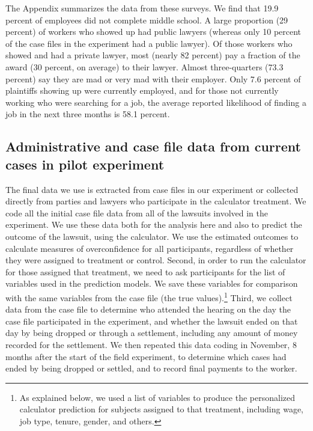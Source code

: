 \documentclass[11pt]{article}
\begin{document}
The Appendix summarizes the data from these surveys. We find that 19.9 percent of employees did not complete middle school. A large proportion (29 percent) of workers who showed up had public lawyers (whereas only 10 percent of the case files in the experiment had a public lawyer). Of those workers who showed and had a private lawyer, most (nearly 82 percent) pay a fraction of the award (30 percent, on average) to their lawyer. Almost three-quarters (73.3 percent) say they are mad or very mad with their employer. Only 7.6 percent of plaintiffs showing up were currently employed, and for those not currently working who were searching for a job, the average reported likelihood of finding a job in the next three months is 58.1 percent.

\subsection{Administrative and case file data from current cases in pilot experiment}


The final data we use is extracted from case files in our experiment or collected directly from
parties and lawyers who participate in the calculator treatment. We code all the initial case file data from all of the lawsuits involved in the experiment. We use these data both for the analysis here and also to predict the outcome of the lawsuit, using the calculator. We use the estimated outcomes to calculate measures of overconfidence for all participants, regardless of whether they were assigned to treatment or control. Second, in order to run the calculator for those assigned that treatment, we need to ask participants for the list of variables  used in the prediction models. We save these variables for comparison with the same variables from the case file (the true values).\footnote{As explained below, we used a list of variables to produce the personalized calculator prediction for subjects assigned to that treatment, including wage, job type, tenure, gender, and others.}  Third, we collect data from the case file to determine who attended the hearing on the day the case file participated in the experiment, and whether the lawsuit ended on that day by being dropped or through a settlement, including any amount of money recorded for the settlement. We then repeated this data coding in November, 8 months after the start of the field experiment, to determine which cases had ended by being dropped or settled, and to record final payments to the worker.
\end{document}

